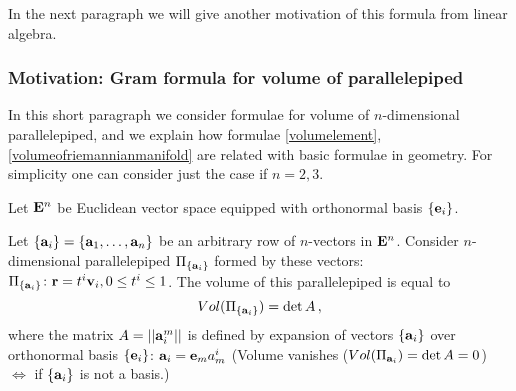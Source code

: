 \documentclass[12pt]{article}
\theoremstyle{theorem}
\numberwithin{equation}{section}
\begin{document}
In the next paragraph we will give another motivation of
this formula from linear algebra.
 


\subsubsection {Motivation: Gram formula for
  volume of parallelepiped}

   In  this short paragraph
we consider formulae for volume of $n$-dimensional
parallelepiped, and we  
 explain how formulae \eqref{volumelement},
 \eqref{volumeofriemannianmanifold} are related with 
basic formulae in geometry.
For simplicity one can  consider just the case
if $n=2,3$.


 Let ${\bf E}^n$ be Euclidean
  vector space equipped with orthonormal 
basis $\{{\bf e}_i\}$. 
 
Let
  $\{{\bf a}_i\}=\{{\bf a}_1,\dots,{\bf a}_n\}$ be an arbitrary row
of $n$-vectors in ${\bf E}^n$.
Consider $n$-dimensional parallelepiped 
$\Pi_{\{{\bf a}_i\}}$ formed 
by these vectors:  
 $\Pi_{\{{\bf a}_i\}}\colon  {\bf r}=t^i{\bf v}_i, 0\leq t^i\leq 1$.
The volume of this parallelepiped 
is equal to 
    \begin{equation}\label{parallelepipinn-dimspace1}
       Vol(\Pi_{\{{\bf a}_i\}})=\det A\,,
             \end{equation}
where the matrix $A=||{\bf a}^m_i||$ 
is defined by expansion of vectors $\{{\bf a}_i\}$
over orthonormal basis $\{{\bf e}_i\}$:
${\bf a}_i={\bf e}_ma_m^i$
(Volume vanishes ($Vol(\Pi_{{\bf a}_i})=\det A=0$) 
$\Leftrightarrow$ if $\{{\bf a}_i\}$ is not a basis.)
\end{document}
